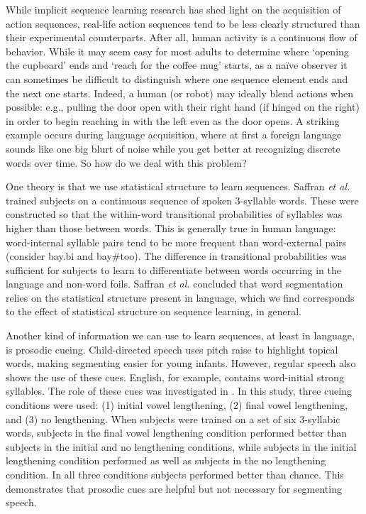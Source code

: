 \documentclass[conference]{IEEEtran}
\begin{document}
While implicit sequence learning research has shed light on the acquisition of action sequences, real-life action sequences tend to be less clearly structured than their experimental counterparts. After all, human activity is a continuous flow of behavior. While it may seem easy for most adults to determine where `opening the cupboard' ends and `reach for the coffee mug' starts, as a na{\"i}ve observer it can sometimes be difficult to distinguish where one sequence element ends and the next one starts. Indeed, a human (or robot) may ideally blend actions when possible: e.g., pulling the door open with their right hand (if hinged on the right) in order to begin reaching in with the left even as the door opens.  A striking example occurs during language acquisition, where at first a foreign language sounds like one big blurt of noise while you get better at recognizing discrete words over time. So how do we deal with this problem? 

One theory is that we use statistical structure to learn sequences. Saffran \textit{et al.} \cite{Saffran:1996} trained subjects on a continuous sequence of spoken 3-syllable words. These were constructed so that the within-word transitional probabilities of syllables was higher than those between words. This is generally true in human language: word-internal syllable pairs tend to be more frequent than word-external pairs (consider bay.bi and bay\#too). The difference in transitional probabilities was sufficient for subjects to learn to differentiate between words occurring in the language and non-word foils. Saffran \textit{et al.} \cite{Saffran:1996} concluded that word segmentation relies on the statistical structure present in language, which we find corresponds to the effect of statistical structure on sequence learning, in general. 

Another kind of information we can use to learn sequences, at least in language, is prosodic cueing. Child-directed speech uses pitch raise to highlight topical words, making segmenting easier for young infants. However, regular speech also shows the use of these cues. English, for example, contains word-initial strong syllables. The role of these cues was investigated in \cite{Saffran:1996}. In this study, three cueing conditions were used: (1) initial vowel lengthening, (2) final vowel lengthening, and (3) no lengthening. When subjects were trained on a set of six 3-syllabic words, subjects in the final vowel lengthening condition performed better than subjects in the initial and no lengthening conditions, while subjects in the initial lengthening condition performed as well as subjects in the no lengthening condition. In all three conditions subjects performed better than chance. This demonstrates that prosodic cues are helpful but not necessary for segmenting speech.
\end{document}
